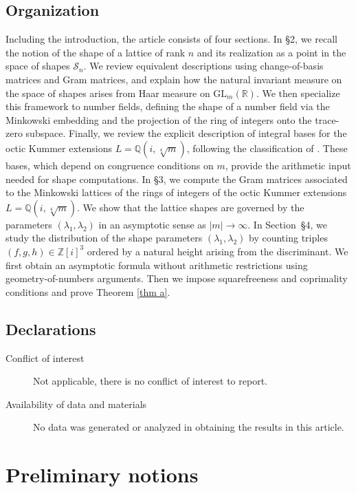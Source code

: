 \documentclass{amsart}
\newcommand{\Q}{\mathbb{Q}}
\newcommand{\R}{\mathbb{R}}
\newcommand{\Z}{\mathbb{Z}}
\newcommand{\GL}{\mathrm{GL}}
\theoremstyle{plain}
\theoremstyle{definition}
\theoremstyle{remark}
\numberwithin{equation}{section}
\begin{document}
\subsection{Organization}
Including the introduction, the article consists of four sections. In \S2, we recall the notion of the shape of a lattice of rank $n$ and its realization as a point in the space of shapes $\mathcal{S}_n$. We review equivalent descriptions using change-of-basis matrices and Gram matrices, and explain how the natural invariant measure on the space of shapes arises from Haar measure on $\GL_m(\R)$. We then specialize this framework to number fields, defining the shape of a number field via the Minkowski embedding and the projection of the ring of integers onto the trace-zero subspace. Finally, we review the explicit description of integral bases for the octic Kummer extensions $L=\Q(i,\sqrt[4]{m})$, following the classification of \cite{quartickummer}. These bases, which depend on congruence conditions on $m$, provide the arithmetic input needed for shape computations. In \S3, we compute the Gram matrices associated to the
Minkowski lattices of the rings of integers of the octic Kummer extensions
$L=\Q(i,\sqrt[4]{m})$. We show that the lattice shapes are governed by the parameters $(\lambda_1, \lambda_2)$ in an asymptotic sense as $|m|\rightarrow \infty$. In Section~\S4, we study the distribution of the shape
parameters $(\lambda_1,\lambda_2)$ by counting triples $(f,g,h)\in\Z[i]^3$
ordered by a natural height arising from the discriminant.
We first obtain an asymptotic formula without arithmetic restrictions using
geometry-of-numbers arguments. Then we impose squarefreeness and
coprimality conditions and prove Theorem \ref{thm a}.

\subsection*{Declarations}
\begin{description}
     \item[Conflict of interest] Not applicable, there is no conflict of interest to report.
    \item[Availability of data and materials] No data was generated or analyzed in obtaining the results in this article.
\end{description}

\section{Preliminary notions} 
\end{document}
